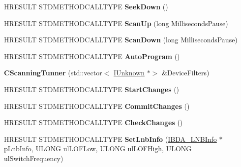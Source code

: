 \begin{DoxyCompactItemize}
H\+R\+E\+S\+U\+LT S\+T\+D\+M\+E\+T\+H\+O\+D\+C\+A\+L\+L\+T\+Y\+PE {\bfseries Seek\+Down} ()
\item 
\mbox{\label{class_c_scanning_tunner_a1e5e633d373036da8b71becf11c802ee}} 
H\+R\+E\+S\+U\+LT S\+T\+D\+M\+E\+T\+H\+O\+D\+C\+A\+L\+L\+T\+Y\+PE {\bfseries Scan\+Up} (long Milliseconds\+Pause)
\item 
\mbox{\label{class_c_scanning_tunner_a1cf21e552813e10ff7686a7b93f1aad3}} 
H\+R\+E\+S\+U\+LT S\+T\+D\+M\+E\+T\+H\+O\+D\+C\+A\+L\+L\+T\+Y\+PE {\bfseries Scan\+Down} (long Milliseconds\+Pause)
\item 
\mbox{\label{class_c_scanning_tunner_aa66a8085117021123ab450c7256fdd44}} 
H\+R\+E\+S\+U\+LT S\+T\+D\+M\+E\+T\+H\+O\+D\+C\+A\+L\+L\+T\+Y\+PE {\bfseries Auto\+Program} ()
\item 
\mbox{\label{class_c_scanning_tunner_a9693f75bfcfb6aa3f64e720b6a7f7f52}} 
{\bfseries C\+Scanning\+Tunner} (std\+::vector$<$ \hyperlink{interface_i_unknown}{I\+Unknown} $\ast$$>$ \&Device\+Filters)
\item 
\mbox{\label{class_c_scanning_tunner_a1f8917b01f6b6710274f6bf45b7a7755}} 
H\+R\+E\+S\+U\+LT S\+T\+D\+M\+E\+T\+H\+O\+D\+C\+A\+L\+L\+T\+Y\+PE {\bfseries Start\+Changes} ()
\item 
\mbox{\label{class_c_scanning_tunner_a14cb60bba8a225faf9615563e77639ec}} 
H\+R\+E\+S\+U\+LT S\+T\+D\+M\+E\+T\+H\+O\+D\+C\+A\+L\+L\+T\+Y\+PE {\bfseries Commit\+Changes} ()
\item 
\mbox{\label{class_c_scanning_tunner_a5e3a6f8de8b8f59a9e264f489f1986de}} 
H\+R\+E\+S\+U\+LT S\+T\+D\+M\+E\+T\+H\+O\+D\+C\+A\+L\+L\+T\+Y\+PE {\bfseries Check\+Changes} ()
\item 
\mbox{\label{class_c_scanning_tunner_a1e7dab7af7a0c952aa7cfda905e6ea4c}} 
H\+R\+E\+S\+U\+LT S\+T\+D\+M\+E\+T\+H\+O\+D\+C\+A\+L\+L\+T\+Y\+PE {\bfseries Set\+Lnb\+Info} (\hyperlink{interface_i_b_d_a___l_n_b_info}{I\+B\+D\+A\+\_\+\+L\+N\+B\+Info} $\ast$p\+Lnb\+Info, U\+L\+O\+NG ul\+L\+O\+F\+Low, U\+L\+O\+NG ul\+L\+O\+F\+High, U\+L\+O\+NG ul\+Switch\+Frequency)
$$
\end{DoxyCompactItemize}
